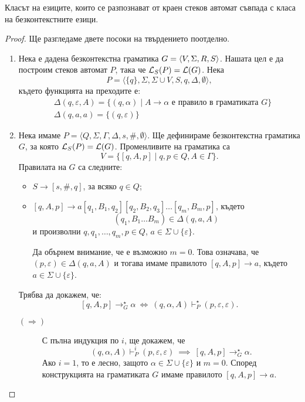 \begin{framed}
\begin{thm}
  \label{th:push-down-context-free}
  Класът на езиците, които се разпознават от краен стеков автомат съвпада с
  класа на безконтекстните езици.
\end{thm}
\end{framed}
\begin{proof}
  Ще разгледаме двете посоки на твърдението поотделно.
  \begin{enumerate}[1)]
  \item 
    Нека е дадена безконтекстна граматика $G = \langle{V,\Sigma,R,S}\rangle$.
    Нашата цел е да построим стеков автомат $P$, така че $\mathcal{L}_S(P) = \mathcal{L}(G)$.
    Нека  \[P = \langle{\{q\},\Sigma,\Sigma\cup V,S,q,\Delta,\emptyset}\rangle,\]
    където функцията на преходите е:
    \begin{align*}
      & \Delta(q,\varepsilon,A) = \{(q,\alpha)\mid A\to\alpha\mbox{ е правило в граматиката }G\}\\
      & \Delta(q,a,a) = \{(q,\varepsilon)\}
    \end{align*}
  \item
    Нека имаме $P = \langle{Q, \Sigma, \Gamma, \Delta, s, \#, \emptyset}\rangle$.
    Ще дефинираме безконтекстна граматика $G$, за която $\mathcal{L}_S(P) = \mathcal{L}(G)$.
    Променливите на граматика са 
    \[V = \{[q,A,p] \mid q,p \in Q, A \in \Gamma\}.\]
    Правилата на $G$ са следните:
    \begin{itemize}
    \item
      $S \to [s,\#,q]$, за всяко $q \in Q$;
    \item
      $[q,A,p] \to a[q_1,B_1,q_2][q_2,B_2,q_3]\dots [q_m,B_m,p]$,
      където 
      \[(q_1,B_1\dots B_m) \in \Delta(q, a, A)\]
      и произволни $q,q_1,\dots,q_{m},p \in Q$,
      $a \in \Sigma \cup \{\varepsilon\}$.

      Да обърнем внимание, че е възможно $m = 0$.
      Това означава, че $(p,\varepsilon) \in \Delta(q, a, A)$ и тогава имаме правилото $[q,A,p] \to a$, където $a \in \Sigma \cup \{\varepsilon\}$.
    \end{itemize}
    Трябва да докажем, че:
    \[[q,A,p] \rightarrow^\star_G \alpha\ \Leftrightarrow\ (q,\alpha,A) \vdash^\star_P (p,\varepsilon,\varepsilon).\]
    \begin{description}
    \item[$(\Rightarrow)$]
      С пълна индукция по $i$, ще докажем, че 
      \[(q,\alpha,A) \vdash^i_P (p,\varepsilon,\varepsilon)\ \implies\ [q,A,p] \to^\star_G \alpha.\]
      Ако $i = 1$, то е лесно, защото $\alpha \in \Sigma \cup\{\varepsilon\}$ и $m = 0$.
      Според конструкцията на граматиката $G$ имаме правилото $[q,A,p] \to a$.


\end{description}
\end{enumerate}
\end{proof}
